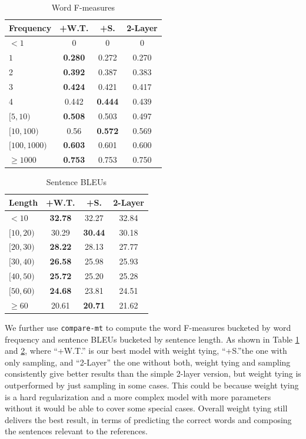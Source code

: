 \documentclass[11pt,a4paper]{article}
\begin{document}
\begin{table}[!htbp]
\centering
\begin{tabular}{l|c|c|c}
  \textbf{Frequency} & \textbf{+W.T.} & +S.& 2-Layer  \\
  \hline
  $<1$ & 0 & 0 & 0 \\
  $1$ & \textbf{0.280} &  0.272 & 0.270 \\
  2 &  \textbf{0.392} & 0.387 & 0.383  \\
3 &  \textbf{0.424} & 0.421 & 0.417 \\
4  & 0.442 & \textbf{0.444} & 0.439 \\
$[5,10)$ & \textbf{0.508} & 0.503 & 0.497 \\
$[10,100)$   & 0.56 & \textbf{0.572} & 0.569 \\
$[100,1000)$ &  \textbf{0.603} & 0.601 & 0.600 \\
$\ge1000$ & \textbf{0.753} & 0.753 & 0.750 \\

\end{tabular}
\caption{Word F-measures}
\label{fmes}
\end{table}

\begin{table}[!htbp]
\centering
\begin{tabular}{l|c|c|c}
  \textbf{Length} & \textbf{+W.T.} & +S.& 2-Layer  \\
  \hline
  $<10$ &\textbf{32.78}& 32.27 &32.84 \\
$[10,20)$ &30.29 &\textbf{30.44} &30.18 \\
$[20,30)$ &\textbf{28.22} &28.13 &27.77 \\
$[30,40)$ &\textbf{26.58} &25.98 &25.93 \\
$[40,50)$ &\textbf{25.72} &25.20 &25.28 \\
$[50,60)$ &\textbf{24.68} &23.81 &24.51 \\
$\ge60$   & 20.61 &\textbf{20.71}& 21.62 \\
\end{tabular}
\caption{Sentence BLEUs}
\label{sbs}
\end{table}

We further use \texttt{compare-mt} \cite{neubig19naacl} to  compute the word F-measures bucketed by word frequency and sentence BLEUs bucketed by sentence length. As shown in Table \ref{fmes} and \ref{sbs}, where ``+W.T.'' is our best model with weight tying, ``+S.''the one with only sampling, and ``2-Layer'' the one without both, weight tying and sampling consistently give better results than the simple 2-layer version, but weight tying is outperformed by just sampling in some cases. This could be because weight tying is a hard regularization and a more complex model with more parameters without it would be able to cover some special cases. Overall weight tying still delivers the best result, in terms of predicting the correct words and composing the sentences relevant to the references.
\end{document}
